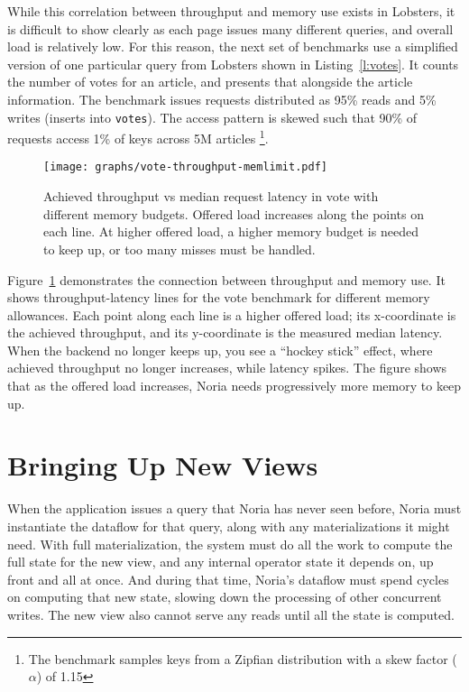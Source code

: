 While this correlation between throughput and memory use exists in Lobsters, it
is difficult to show clearly as each page issues many different queries, and
overall load is relatively low. For this reason, the next set of benchmarks use
a simplified version of one particular query from Lobsters shown in
Listing~\ref{l:votes}. It counts the number of votes for an article, and
presents that alongside the article information. The benchmark issues requests
distributed as 95\% reads and 5\% writes (inserts into \texttt{votes}). The
access pattern is skewed such that 90\% of requests access 1\% of keys across 5M
articles%
\footnote{The benchmark samples keys from a Zipfian distribution with a skew
factor ($\alpha$) of 1.15}.

\begin{figure}[h]
  \centering
  \texttt{[image: graphs/vote-throughput-memlimit.pdf]}
  \caption{Achieved throughput vs median request latency in vote with
  different memory budgets. Offered load increases along the points on each
  line. At higher offered load, a higher memory budget is needed to keep up, or
  too many misses must be handled.}
  \label{f:vote-throughput-memlimit}
\end{figure}

Figure~\ref{f:vote-throughput-memlimit} demonstrates the connection between
throughput and memory use. It shows throughput-latency lines for the vote
benchmark for different memory allowances. Each point along each line is a
higher offered load; its x-coordinate is the achieved throughput, and its
y-coordinate is the measured median latency. When the backend no longer keeps
up, you see a ``hockey stick'' effect, where achieved throughput no longer
increases, while latency spikes. The figure shows that as the offered load
increases, Noria needs progressively more memory to keep up.

\section{Bringing Up New Views}
\label{s:eval:mig}

When the application issues a query that Noria has never seen before, Noria must
instantiate the dataflow for that query, along with any materializations it
might need. With full materialization, the system must do all the work to
compute the full state for the new view, and any internal operator state it
depends on, up front and all at once. And during that time, Noria's dataflow
must spend cycles on computing that new state, slowing down the processing of
other concurrent writes. The new view also cannot serve any reads until all the
state is computed.

